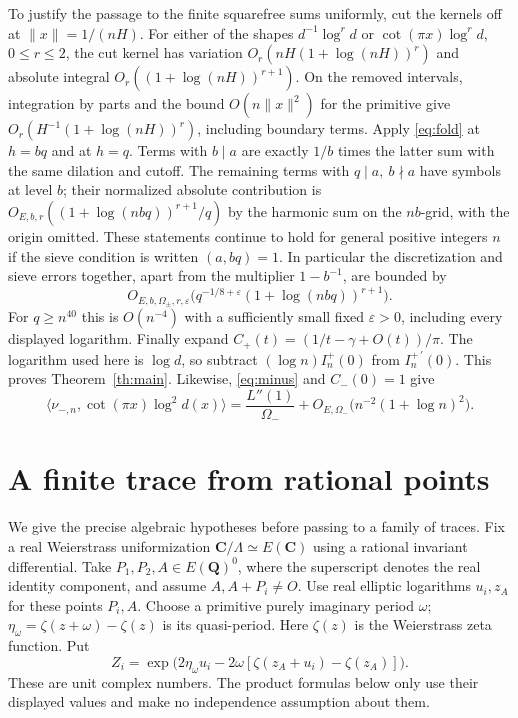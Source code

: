 \documentclass[11pt]{article}
\newcommand{\Q}{\mathbf Q}\newcommand{\R}{\mathbf R}\newcommand{\Z}{\mathbf Z}
\newcommand{\C}{\mathbf C}\newcommand{\eps}{\varepsilon}\newcommand{\dd}{\mathrm d}
\begin{document}
To justify the passage to the finite squarefree sums uniformly, cut the
kernels off at \(\|x\|=1/(nH)\). For either of the shapes
\(d^{-1}\log^r d\) or \(\cot(\pi x)\log^r d\), \(0\le r\le2\),
the cut kernel has variation \(O_r(nH(1+\log(nH))^r)\) and absolute
integral \(O_r((1+\log(nH))^{r+1})\). On the removed intervals,
integration by parts and the bound \(O(n\|x\|^2)\) for the primitive
give \(O_r(H^{-1}(1+\log(nH))^r)\), including boundary terms.
Apply \eqref{eq:fold} at \(h=bq\) and at \(h=q\). Terms with \(b\mid a\) are
exactly \(1/b\) times the latter sum with the same dilation and cutoff.
The remaining terms with \(q\mid a,\ b\nmid a\) have symbols at level
\(b\); their normalized absolute contribution is
\(O_{E,b,r}((1+\log(n bq))^{r+1}/q)\) by the harmonic sum on the
\(nb\)-grid, with the origin omitted. These statements continue to
hold for general positive integers \(n\) if the sieve condition is
written \((a,bq)=1\).
In particular the discretization and sieve errors together, apart from
the multiplier \(1-b^{-1}\), are bounded by
\begin{equation}\label{eq:disc}
 O_{E,b,\Omega_\pm,r,\eps}\bigl(q^{-1/8+\eps}(1+\log(n bq))^{r+1}\bigr).
\end{equation}
For \(q\ge n^{40}\) this is \(O(n^{-4})\) with a sufficiently small
fixed \(\eps>0\), including every displayed logarithm. Finally expand
\(C_+(t)=(1/t-\gamma+O(t))/\pi\). The logarithm used here is \(\log d\),
so subtract \((\log n) I_n^+(0)\) from \(I_n^{+\,\prime}(0)\).
This proves Theorem~\ref{th:main}. Likewise, \eqref{eq:minus} and
\(C_-(0)=1\) give
\begin{equation}\label{eq:odd}
 \langle\nu_{-,n},\cot(\pi x)\log^2 d(x)\rangle
 =\frac{L''(1)}{\Omega_-}
 +O_{E,\Omega_-}\bigl(n^{-2}(1+\log n)^2\bigr).
\end{equation}

\section{A finite trace from rational points}
We give the precise algebraic hypotheses before passing to a family of
traces. Fix a real Weierstrass uniformization \(\C/\Lambda\simeq E(\C)\)
using a rational invariant differential. Take \(P_1,P_2,A\in E(\Q)^0\),
where the superscript denotes the real identity component, and assume
\(A,A+P_i\ne O\). Use real elliptic logarithms \(u_i,z_A\) for these
points \(P_i,A\). Choose a primitive purely imaginary period \(\omega\);
\(\eta_\omega=\zeta(z+\omega)-\zeta(z)\) is its quasi-period.
Here \(\zeta(z)\) is the Weierstrass zeta function. Put
\begin{equation}\label{eq:phase}
 Z_i=\exp\!\bigl(2\eta_\omega u_i
        -2\omega[\zeta(z_A+u_i)-\zeta(z_A)]\bigr).
\end{equation}
These are unit complex numbers. The product formulas below only use
their displayed values and make no independence assumption about them.
\end{document}
